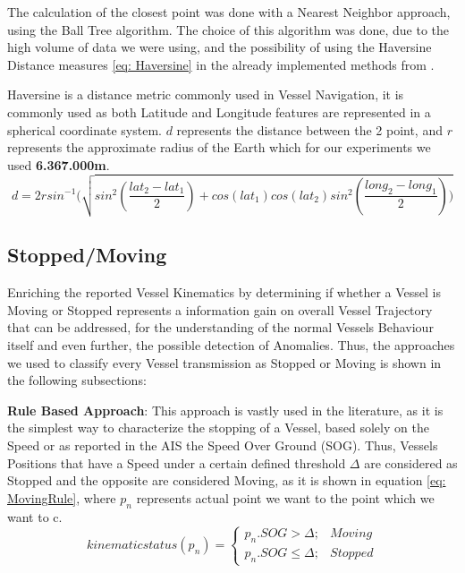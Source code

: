 The calculation of the closest point was done with a Nearest Neighbor approach, using the Ball Tree algorithm. The choice of this algorithm was done, due to the high volume of data we were using, and the possibility of using the Haversine Distance measures \eqref{eq: Haversine} in the already implemented methods from .

Haversine is a distance metric commonly used in Vessel Navigation, it is commonly used as both Latitude and Longitude features are represented in a spherical coordinate system. $d$ represents the distance between the 2 point, and $r$ represents the approximate radius of the Earth which for our experiments we used  \textbf{6.367.000m}.
\begin{equation}
d = 2r sin ^{-1} (\sqrt{sin^2(\frac{lat_{2}-lat_{1}}{2})+cos(lat_{1})cos(lat_{2})sin^2(\frac{long_{2}-long_{1}}{2}))}
\label{eq: Haversine}
\end{equation}

\subsection{Stopped/Moving}
Enriching the reported Vessel Kinematics by determining if whether a Vessel is Moving or Stopped represents a information gain on overall Vessel Trajectory that can be addressed, for the understanding of the normal Vessels Behaviour itself and even further, the possible detection of Anomalies.
Thus, the approaches we used to classify every Vessel transmission as Stopped or Moving is shown in the following subsections:

\textbf{Rule Based Approach}:
This approach is vastly used in the literature, as it is the simplest way to characterize the stopping of a Vessel, based solely on the Speed or as reported in the AIS the Speed Over Ground (SOG). Thus, Vessels Positions that have a Speed under a certain defined threshold $\Delta$ are considered as Stopped and the opposite are considered Moving, as it is shown in equation \ref{eq: MovingRule}, where $p_n$ represents actual point we want to the point which we want to c.
\begin{equation}
kinematic status(p_n) = \left\{\begin{matrix}
p_n.SOG > \Delta; & Moving\\ 
p_n.SOG \leq  \Delta; & Stopped
\end{matrix}\right.
\label{eq: MovingRule}
\end{equation}

